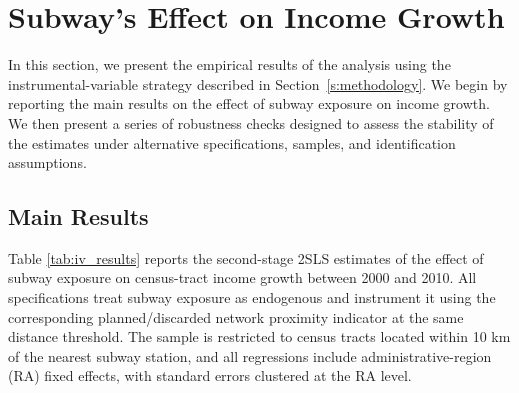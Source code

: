 \section{Subway's Effect on Income Growth}
\label{s:results}

In this section, we present the empirical results of the analysis using the instrumental-variable strategy described in Section~\ref{s:methodology}. We begin by reporting the main results on the effect of subway exposure on income growth.  We then present a series of robustness checks designed to assess the stability of the estimates under alternative specifications, samples, and identification assumptions.

\subsection{Main Results}
\label{s:results1}

Table \ref{tab:iv_results} reports the second-stage 2SLS estimates of the effect of subway exposure on census-tract income growth between 2000 and 2010. All specifications treat subway exposure as endogenous and instrument it using the corresponding planned/discarded network proximity indicator at the same distance threshold. The sample is restricted to census tracts located within 10 km of the nearest subway station, and all regressions include administrative-region (RA) fixed effects, with standard errors clustered at the RA level.

